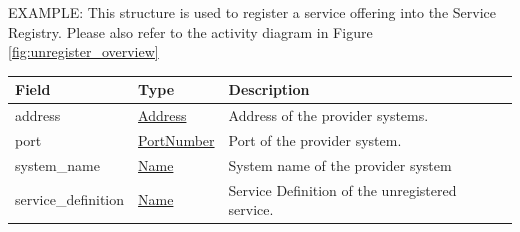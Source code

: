 \documentclass[a4paper]{arrowhead}
\newcommand{\pref}[1]{{\textcolor{ArrowheadGrey}{\hyperref[sec:model:primitives:#1]{#1}}}}
\begin{document}

\color{red} 
EXAMPLE: This structure is used to register a service offering into
the Service Registry. Please also refer to the activity diagram in
Figure \ref{fig:unregister_overview} \color{black}

\begin{table}[ht!]
\begin{tabularx}{\textwidth}{| p{4.25cm} | p{3.5cm} | X |} \hline
\rowcolor{gray!33} Field & Type      & Description \\ \hline
address                 & \pref{Address} & Address of the provider systems. \\ \hline
port                   & \pref{PortNumber}     & Port of the provider system. \\ \hline
system\_name                  & \pref{Name}     & System name of the provider system \\ \hline
service\_definition                    & \pref{Name} & Service Definition of the unregistered service. \\ \hline
\end{tabularx}
\end{table}
\end{document}
